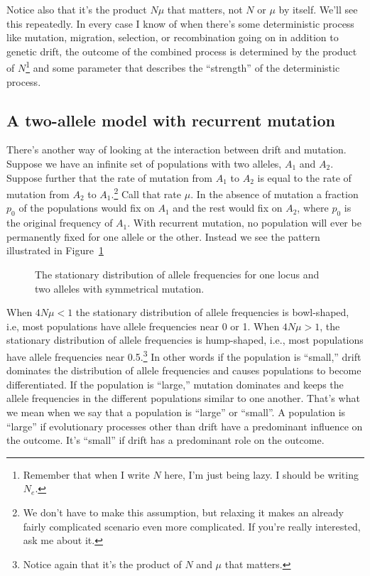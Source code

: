 \documentclass[12pt]{article}
\begin{document}
Notice also that it's the product $N\mu$ that matters, not $N$ or
$\mu$ by itself. We'll see this repeatedly. In every case I know of
when there's some deterministic process like mutation, migration,
selection, or recombination going on in addition to genetic drift, the
outcome of the combined process is determined by the product of
$N$\footnote{Remember that when I write $N$ here, I'm just being
  lazy. I should be writing $N_e$.} and some parameter that describes
the ``strength'' of the deterministic process.

\subsection*{A two-allele model with recurrent mutation}

There's another way of looking at the interaction between drift and
mutation. Suppose we have an infinite set of populations with two
alleles, $A_1$ and $A_2$. Suppose further that the rate of mutation
from $A_1$ to $A_2$ is equal to the rate of mutation from $A_2$ to
$A_1$.\footnote{We don't have to make this assumption, but relaxing it
  makes an already fairly complicated scenario even more
  complicated. If you're really interested, ask me about it.} Call
that rate $\mu$. In the absence of mutation a fraction $p_0$ of the
populations would fix on $A_1$ and the rest would fix on $A_2$, where
$p_0$ is the original frequency of $A_1$. With recurrent mutation, no
population will ever be permanently fixed for one allele or the
other. Instead we see the pattern illustrated in
Figure~\ref{fig:drift-mutation}

\begin{figure}
\begin{center}
\end{center}
\caption{The stationary distribution of allele frequencies for one
  locus and two alleles with symmetrical mutation.}\label{fig:drift-mutation}
\end{figure}

When $4N\mu < 1$ the stationary distribution of allele frequencies is
bowl-shaped, i.e, most populations have allele frequencies near 0 or
1. When $4N\mu > 1$, the stationary distribution of allele frequencies
is hump-shaped, i.e., most populations have allele frequencies near
0.5.\footnote{Notice again that it's the product of $N$ and $\mu$ that
  matters.} In other words if the population is ``small,'' drift
dominates the distribution of allele frequencies and causes
populations to become differentiated. If the population is ``large,''
mutation dominates and keeps the allele frequencies in the different
populations similar to one another. That's what we mean when we say
that a population is ``large'' or ``small''. A population is ``large''
if evolutionary processes other than drift have a predominant
influence on the outcome. It's ``small'' if drift has a predominant
role on the outcome.
\end{document}
